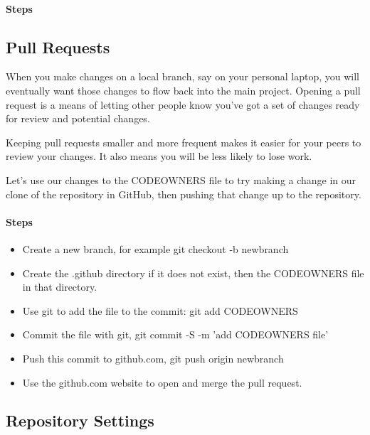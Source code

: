 \hypertarget{steps-3}{%
      \paragraph{Steps}\label{steps-3}}


\subsection{Pull Requests}

\justify
When you make changes on a local branch, say on your personal laptop,
you will eventually want those changes to flow back into the main
project. Opening a pull request is a means of letting other people know
you've got a set of changes ready for review and potential
changes.

\justify
Keeping pull requests smaller and more frequent makes it easier for your
peers to review your changes. It also means you will be less likely to
lose work.

\justify
Let's use our changes to the CODEOWNERS file to try making a change in
our clone of the repository in GitHub, then pushing that change up to
the repository.

\hypertarget{steps-4}{%
      \paragraph{Steps}\label{steps-4}}

\begin{itemize}

      \item
            Create a new branch, for example git checkout -b newbranch
      \item
            Create the .github directory if it does not exist, then the CODEOWNERS
            file in that directory.
      \item
            Use git to add the file to the commit: git add CODEOWNERS
      \item
            Commit the file with git, git commit -S -m 'add CODEOWNERS file'
      \item
            Push this commit to github.com, git push origin newbranch
      \item
            Use the github.com website to open and merge the pull request.
\end{itemize}


\subsection{Repository Settings}

